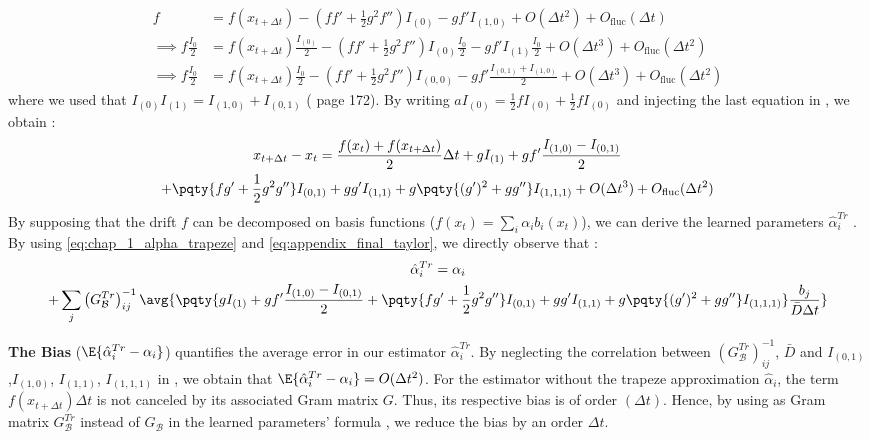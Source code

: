 \begin{align}
    f &= f(x_{t+\Delta t}) -  \left(f f' + \frac{1}{2}g^2 f''\right)I_{(0)} 
    - g f' I_{(1,0)} + O(\Delta t^2) + O_\text{fluc}(\Delta t)\\
    \implies f \frac{I_{0}}{2} &= f(x_{t+\Delta t})\frac{I_{(0)}}{2} - \left(f f' + \frac{1}{2}g^2 f''\right)I_{(0)}\frac{I_{0}}{2}  - g f' I_{(1)}\frac{I_{0}}{2} + O(\Delta t^3) + O_\text{fluc}(\Delta t^2)\\
    \implies f \frac{I_{0}}{2} &= f(x_{t+\Delta t})\frac{I_0}{2} - \left(f f' + \frac{1}{2}g^2 f''\right)I_{(0,0)}  - g f'\frac{I_{(0,1)} + I_{(1,0)}}{2} + O(\Delta t^3) + O_\text{fluc}(\Delta t^2)
\end{align}
where we used that $I_{(0)} I_{(1)} = I_{(1,0)} + I_{(0,1)}$  (\cite{kloedenStochasticTaylorExpansions1992} page 172). By writing $a I_{(0)} = \frac{1}{2} f I_{(0)} + \frac{1}{2} f I_{(0)}$ and injecting the last equation in , we obtain :
\begin{multline}
    x_{t+\Delta t} - x_{t} =  \frac{f(x_t) + f(x_{t+\Delta t})}{2}\Delta t + g I_{(1)} + g f' \frac{I_{(1,0)} - I_{(0,1)}}{2} \\
 +\pqty{fg'+ \frac{1}{2} g^2 g''} I_{(0,1)}  + gg' I_{(1,1)} + g\pqty{(g')^2 + g g''} I_{(1,1,1)} + O(\Delta t^3) + O_\text{fluc}(\Delta t^{2})
 \label{eq:appendix_final_taylor}
\end{multline}
By supposing that the drift $f$ can be decomposed on basis functions ($f(x_t) = \sum_i \alpha_i b_i(x_t)$), we can derive the learned parameters $\hat{\alpha}_i^{Tr}$ . By using \ref{eq:chap_1_alpha_trapeze} and \ref{eq:appendix_final_taylor}, we directly observe that :
\begin{multline}
    \hat{\alpha}_i^{Tr} = \alpha_i \\+ \sum_j \left(G_{\mathcal{B}}^{Tr}\right)^{-1}_{ij} \avg{\pqty{g I_{(1)} + g f' \frac{I_{(1,0)} - I_{(0,1)}}{2} 
 +\pqty{fg'+ \frac{1}{2} g^2 g''} I_{(0,1)}  + gg' I_{(1,1)} + g\pqty{(g')^2 + g g''} I_{(1,1,1)}}\frac{b_j}{\bar{D} \Delta t}}
 \label{eq:appendix_alpha_fluct}
\end{multline}


\textbf{The Bias} ($\E{\hat{\alpha}_i^{Tr} - \alpha_i}$) quantifies the average error in our estimator $\hat{\alpha}_i^{Tr}$. By neglecting the correlation between $\left(G_{\mathcal{B}}^{Tr}\right)^{-1}_{ij}$, $\bar{D}$ and $I_{(0,1)}$,$I_{(1,0)}$, $I_{(1,1)}$, $I_{(1,1,1)}$ in , we obtain that $\E{\hat{\alpha}_i^{Tr} - \alpha_i} = O(\Delta t^2)$. For the estimator without the trapeze approximation $\hat{\alpha}_i$, the term $f(x_{t+\Delta t}) \Delta t$ is not canceled by its associated Gram matrix $G$. Thus, its respective bias is of order $(\Delta t)$. Hence, by using as Gram matrix $G_{\mathcal{B}}^{Tr}$ instead of $G_{\mathcal{B}}$ in the learned parameters' formula , we reduce the bias by an order $\Delta t$.

